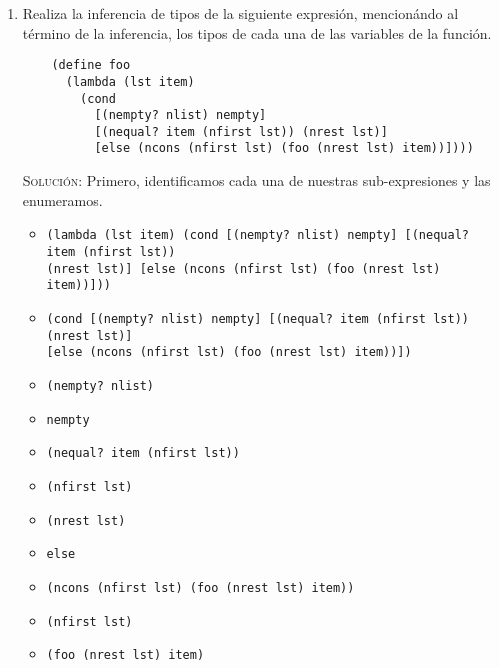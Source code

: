 \documentclass[letterpaper,11pt]{article}
\begin{document}
\begin{enumerate}
    \item Realiza la inferencia de tipos de la siguiente expresión, mencionándo
    al término de la inferencia, los tipos de cada una de las variables de la 
    función.
    \begin{verbatim}
    (define foo 
      (lambda (lst item)
        (cond 
          [(nempty? nlist) nempty]
          [(nequal? item (nfirst lst)) (nrest lst)]
          [else (ncons (nfirst lst) (foo (nrest lst) item))])))
    \end{verbatim}

    \textsc{Solución:} Primero, identificamos cada una de nuestras 
    sub-expresiones y las enumeramos.
    \begin{itemize}
        \item {} \texttt{(lambda (lst item) (cond [(nempty? nlist) nempty]
        [(nequal? item (nfirst lst))} \\ 
        \texttt{(nrest lst)] [else (ncons (nfirst lst) (foo (nrest lst) item))]))}

        \item {} \texttt{(cond [(nempty? nlist) nempty] [(nequal? item 
        (nfirst lst)) (nrest lst)]} \\ 
        \texttt{[else (ncons (nfirst lst) (foo (nrest lst) item))])}

        \item {} \texttt{(nempty? nlist)}

        \item {} \texttt{nempty}
        
        \item {} \texttt{(nequal? item (nfirst lst))}

        \item {} \texttt{(nfirst lst)}
        
        \item {} \texttt{(nrest lst)}
        
        \item {} \texttt{else}
        
        \item {} \texttt{(ncons (nfirst lst) (foo (nrest lst) item))}

        \item {} \texttt{(nfirst lst)}

        \item {} \texttt{(foo (nrest lst) item)}


\end{itemize}
\end{enumerate}
\end{document}

